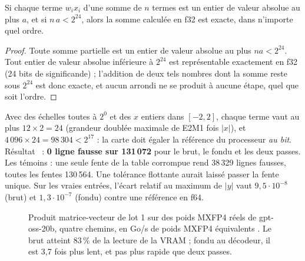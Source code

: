 \begin{lemme}\label{lem:ent-exact}
Si chaque terme $w_i x_i$ d'une somme de $n$ termes est un entier de valeur absolue au plus $a$, et si $n\,a < 2^{24}$, alors la somme calculée en f32 est exacte, dans n'importe quel ordre.
\end{lemme}

\begin{proof}
Toute somme partielle est un entier de valeur absolue au plus $n a < 2^{24}$. Tout entier de valeur absolue inférieure à $2^{24}$ est représentable exactement en f32 (24 bits de significande) ; l'addition de deux tels nombres dont la somme reste sous $2^{24}$ est donc exacte, et aucun arrondi ne se produit à aucune étape, quel que soit l'ordre.
\end{proof}

Avec des échelles toutes à $2^0$ et des $x$ entiers dans $[-2, 2]$, chaque terme vaut au plus $12 \times 2 = 24$ (grandeur doublée maximale de E2M1 fois $|x|$), et $4\,096 \times 24 = 98\,304 < 2^{17}$ : la carte doit égaler la référence du processeur \emph{au bit}. Résultat \mes~: \textbf{0 ligne fausse sur 131\,072} pour le brut, le fondu et les deux passes. Les témoins : une seule fente de la table corrompue rend 38\,329 lignes fausses, toutes les fentes 130\,564. Une tolérance flottante aurait laissé passer la fente unique. Sur les vraies entrées, l'écart relatif au maximum de $|y|$ vaut $9{,}5\cdot10^{-8}$ (brut) et $1{,}3\cdot10^{-7}$ (fondu) contre une référence en f64.

\begin{figure}[ht]
\centering
\GrapheGemvEntropie
\caption[Le produit MXFP4 brut, fondu au décodeur, ou en deux passes]{Produit matrice-vecteur de lot 1 sur des poids MXFP4 réels de gpt-oss-20b, quatre chemins, en Go/s de poids MXFP4 équivalents \mes. Le brut atteint 83\,\% de la lecture de la VRAM ; fondu au décodeur, il est 3,7 fois plus lent, et pas plus rapide que deux passes.}
\label{fig:ent-gemv}
\end{figure}

